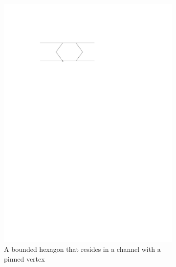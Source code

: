 \begin{figure}[h]
\begin{center}
  ~ %
  \begin{subfigure}[b]{0.49\textwidth}
	  \includegraphics[width=\textwidth]{graphics/hexagonInChannelWithPinnedJointRight.pdf}
	  \caption{A bounded hexagon that resides in a channel with a pinned vertex}
	  \label{fig:linkage-1-1}
  \end{subfigure}
  \begin{subfigure}[b]{0.49\textwidth}

\end{subfigure}
\end{center}
\end{figure}
